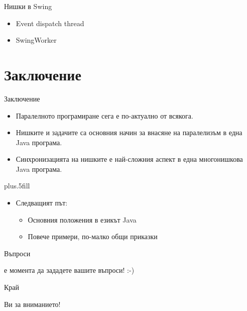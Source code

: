 \documentclass{beamer}
\begin{document}
\begin{frame}{Нишки в Swing}
  \transdissolve
  \begin{itemize}
  \item Event dispatch thread
  \item SwingWorker
  \end{itemize}
\end{frame}


\section*{Заключение}

\begin{frame}{Заключение}
  \transdissolve
  \begin{itemize}
  \item
    Паралелното програмиране сега е по-актуално от всякога.
  \item
    Нишките и задачите са основния начин за внасяне на паралелизъм в
    една Java програма.
  \item
    Синхронизацията на нишките е най-сложния аспект в една
    многонишкова Java програма.
  \end{itemize}
  
  \vskip0pt plus.5fill
  \begin{itemize}
  \item
    Следващият път:
    \begin{itemize}
    \item
      Основния положения в езикът Java
    \item
      Повече примери, по-малко общи приказки
    \end{itemize}
  \end{itemize}
\end{frame}

\begin{frame}{Въпроси}
  \transdissolve
  \begin{center}
     е момента да зададете вашите въпроси! :-)
  \end{center}
\end{frame}

\begin{frame}{Край}
  \transdissolve
  \begin{center}
     Ви за вниманието!
  \end{center}
\end{frame}
\end{document}
